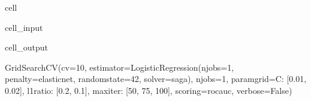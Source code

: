 \documentclass[letterpaper,10pt,english]{jupyterBook}
\begin{document}
\begin{sphinxuseclass}{cell}
\begin{sphinxVerbatimInput}
\begin{sphinxuseclass}{cell_input}
\end{sphinxuseclass}\end{sphinxVerbatimInput}
\begin{sphinxVerbatimOutput}

\begin{sphinxuseclass}{cell_output}
\begin{sphinxVerbatim}[commandchars=\\\{\}]
GridSearchCV(cv=10,
             estimator=LogisticRegression(n\PYGZus{}jobs=\PYGZhy{}1, penalty=\PYGZsq{}elasticnet\PYGZsq{},
                                          random\PYGZus{}state=42, solver=\PYGZsq{}saga\PYGZsq{}),
             n\PYGZus{}jobs=\PYGZhy{}1,
             param\PYGZus{}grid=\PYGZob{}\PYGZsq{}C\PYGZsq{}: [0.01, 0.02], \PYGZsq{}l1\PYGZus{}ratio\PYGZsq{}: [0.2, 0.1],
                         \PYGZsq{}max\PYGZus{}iter\PYGZsq{}: [50, 75, 100]\PYGZcb{},
             scoring=\PYGZsq{}roc\PYGZus{}auc\PYGZsq{}, verbose=False)
\end{sphinxVerbatim}

\end{sphinxuseclass}\end{sphinxVerbatimOutput}

\end{sphinxuseclass}
\end{document}
